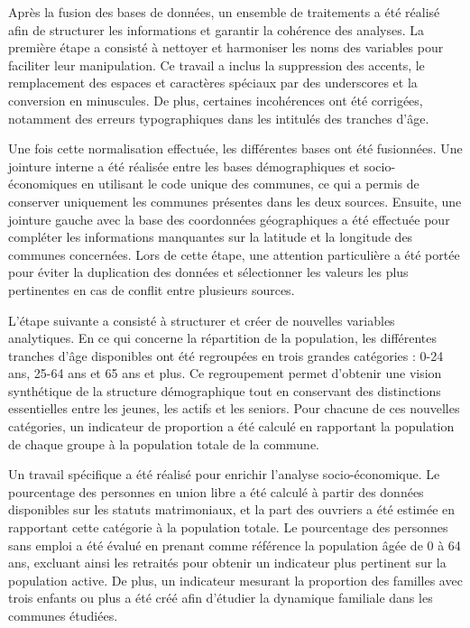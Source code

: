 \documentclass[
]{article}
\begin{document}
Après la fusion des bases de données, un ensemble de traitements a été
réalisé afin de structurer les informations et garantir la cohérence des
analyses. La première étape a consisté à nettoyer et harmoniser les noms
des variables pour faciliter leur manipulation. Ce travail a inclus la
suppression des accents, le remplacement des espaces et caractères
spéciaux par des underscores et la conversion en minuscules. De plus,
certaines incohérences ont été corrigées, notamment des erreurs
typographiques dans les intitulés des tranches d'âge.

Une fois cette normalisation effectuée, les différentes bases ont été
fusionnées. Une jointure interne a été réalisée entre les bases
démographiques et socio-économiques en utilisant le code unique des
communes, ce qui a permis de conserver uniquement les communes présentes
dans les deux sources. Ensuite, une jointure gauche avec la base des
coordonnées géographiques a été effectuée pour compléter les
informations manquantes sur la latitude et la longitude des communes
concernées. Lors de cette étape, une attention particulière a été portée
pour éviter la duplication des données et sélectionner les valeurs les
plus pertinentes en cas de conflit entre plusieurs sources.

L'étape suivante a consisté à structurer et créer de nouvelles variables
analytiques. En ce qui concerne la répartition de la population, les
différentes tranches d'âge disponibles ont été regroupées en trois
grandes catégories : 0-24 ans, 25-64 ans et 65 ans et plus. Ce
regroupement permet d'obtenir une vision synthétique de la structure
démographique tout en conservant des distinctions essentielles entre les
jeunes, les actifs et les seniors. Pour chacune de ces nouvelles
catégories, un indicateur de proportion a été calculé en rapportant la
population de chaque groupe à la population totale de la commune.

Un travail spécifique a été réalisé pour enrichir l'analyse
socio-économique. Le pourcentage des personnes en union libre a été
calculé à partir des données disponibles sur les statuts matrimoniaux,
et la part des ouvriers a été estimée en rapportant cette catégorie à la
population totale. Le pourcentage des personnes sans emploi a été évalué
en prenant comme référence la population âgée de 0 à 64 ans, excluant
ainsi les retraités pour obtenir un indicateur plus pertinent sur la
population active. De plus, un indicateur mesurant la proportion des
familles avec trois enfants ou plus a été créé afin d'étudier la
dynamique familiale dans les communes étudiées.
\end{document}
